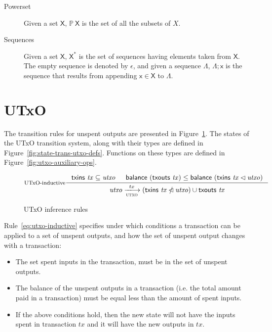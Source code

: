 \documentclass[11pt,a4paper]{article}
\newcommand{\powerset}[1]{\mathbb{P}~#1}
\newcommand{\restrictdom}{\lhd}
\newcommand{\subtractdom}{\mathbin{\slashed{\restrictdom}}}
\newcommand{\var}[1]{\mathit{#1}}
\newcommand{\fun}[1]{\mathsf{#1}}
\newcommand{\type}[1]{\mathsf{#1}}
\newcommand{\trans}[2]{\xlongrightarrow[\textsc{#1}]{#2}}
\newcommand{\seqof}[1]{#1^{*}}
\newcommand{\txins}[1]{\fun{txins}~ \var{#1}}
\newcommand{\txouts}[1]{\fun{txouts}~ \var{#1}}
\newcommand{\balance}[1]{\fun{balance}~ \var{#1}}
\begin{document}
\begin{description}
\item[Powerset] Given a set $\type{X}$, $\powerset{\type{X}}$ is the set of all
  the subsets of $X$.
\item[Sequences] Given a set $\type{X}$, $\seqof{\type{X}}$ is the set of
  sequences having elements taken from $\type{X}$. The empty sequence is
  denoted by $\epsilon$, and given a sequence $\Lambda$, $\Lambda; \type{x}$ is
  the sequence that results from appending $\type{x} \in \type{X}$ to
  $\Lambda$.
\end{description}

\section{UTxO}
\label{sec:state-trans-utxo-1}

The transition rules for unspent outputs are presented in
Figure~\ref{fig:state-trans-utxo}. The states of the UTxO transition system,
along with their types are defined in Figure~\ref{fig:state-trans-utxo-defs}.
Functions on these types are defined in Figure~\ref{fig:utxo-auxiliary-ops}.

\begin{figure}
  \begin{equation}\label{eq:utxo-inductive}
    \inference[UTxO-inductive]
    { \txins{tx} \subseteq \var{utxo}
      & \balance{(\txouts{tx})} \leq \balance{(\txins{tx} \restrictdom \var{utxo})}
    }
    {\var{utxo} \trans{utxo}{tx}
      (\txins{tx} \subtractdom \var{utxo}) \cup \txouts{tx}
    }
  \end{equation}
  \caption{UTxO inference rules}
  \label{fig:state-trans-utxo}
\end{figure}

Rule~\ref{eq:utxo-inductive} specifies under which conditions a transaction can
be applied to a set of unspent outputs, and how the set of unspent output
changes with a transaction:
\begin{itemize}
\item The set spent inputs in the transaction, must be in the set of unspent
  outputs.
\item The balance of the unspent outputs in a transaction (i.e. the total
  amount paid in a transaction) must be equal less than the amount of spent
  inputs.
\item If the above conditions hold, then the new state will not have the inputs
  spent in transaction $\var{tx}$ and it will have the new outputs in
  $\var{tx}$.
\end{itemize}
\end{document}
